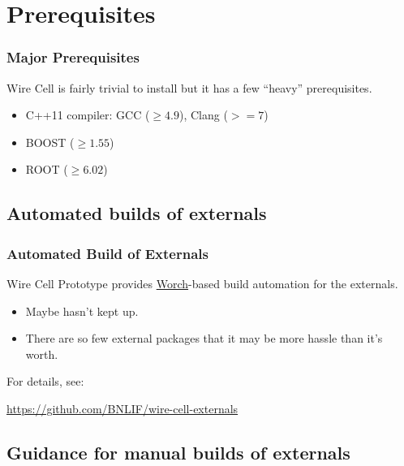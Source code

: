 \documentclass[xcolor=dvipsnames]{beamer}
\begin{document}




\section{Prerequisites}

\begin{frame}
  \frametitle{Major Prerequisites}

  Wire Cell is fairly trivial to install but it has a few ``heavy'' prerequisites. 

  \begin{itemize}
  \item C++11 compiler: GCC ($\ge 4.9$), Clang ($>=7$)
  \item BOOST ($\ge 1.55$)
  \item ROOT ($\ge 6.02$)
  \end{itemize}
\end{frame}

\subsection{Automated builds of externals}
\begin{frame}
  \frametitle{Automated Build of Externals}

  Wire Cell Prototype provides
  \href{https://github.com/brettviren/worch}{Worch}-based build
  automation for the externals.  

  \begin{itemize}
  \item Maybe hasn't kept up.
  \item There are so few external packages that it may be more hassle than it's worth.
  \end{itemize}

  For details, see:

  \begin{center}
      \url{https://github.com/BNLIF/wire-cell-externals}
  \end{center}
\end{frame}

\subsection{Guidance for manual builds of externals}
\end{document}
